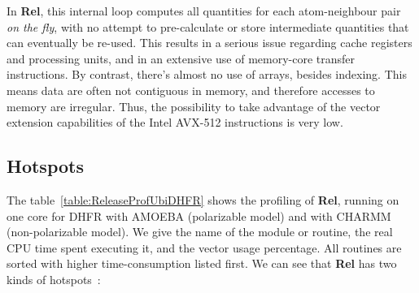 \documentclass[9pt,comparison]{livecoms}
\begin{document}
In \textbf{Rel}, this internal loop computes all quantities for each atom-neighbour pair \emph{on the fly}, with no attempt to pre-calculate or store intermediate quantities that can eventually be re-used. This results in a serious issue regarding cache registers and processing units, and in an extensive use of memory-core transfer instructions. By contrast, there's almost no use of arrays, besides indexing. This means data are often not contiguous in memory, and therefore accesses to memory are irregular. Thus, the possibility to take advantage of the vector extension capabilities of the Intel AVX-512 instructions is very low. 
\subsection{Hotspots}
\hspace{\parindent}The table~\ref{table:ReleaseProfUbiDHFR} shows the profiling of \textbf{Rel}, running on one core for DHFR with AMOEBA (polarizable model) and with CHARMM (non-polarizable model). We give the name of the module or routine, the real CPU time spent executing it, and the vector usage percentage. All routines are sorted with higher time-consumption listed first.  We can see that \textbf{Rel} has two kinds of hotspots~:
\end{document}
